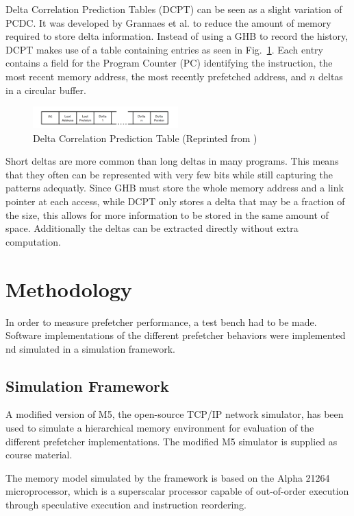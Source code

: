 \documentclass[a4paper]{IEEEtran}
\begin{document}
Delta Correlation Prediction Tables (DCPT) can be seen as a slight variation of PCDC.
It was developed by Grannaes et al. \cite{dcpt} to reduce the amount of memory required to store delta information.
Instead of using a GHB to record the history, DCPT makes use of a table containing entries as seen in Fig.~\ref{fig:dcpt}.
Each entry contains  a field for the Program Counter (PC) identifying the instruction, the most recent memory address, the most recently prefetched address, and $n$ deltas in a circular buffer.

\begin{figure}[h!]
  \centering
      \includegraphics[width=0.5\textwidth]{Figures/DCTable}
  \caption{Delta Correlation Prediction Table (Reprinted from \protect\cite{dcpt})}
  \label{fig:dcpt}
\end{figure}

Short deltas are more common than long deltas in many programs.
This means that they often can be represented with very few bits while still capturing the patterns adequatly.
Since GHB must store the whole memory address and a link pointer at each access, while DCPT only stores a delta that may be a fraction of the size, this allows for more information to be stored in the same amount of space.
Additionally the deltas can be extracted directly without extra computation.

\section{Methodology}

In order to measure prefetcher performance, a test bench had to be made.
Software implementations of the different prefetcher behaviors were implemented nd simulated in a simulation framework.

\subsection{Simulation Framework}

A modified version of M5, the open-source TCP/IP network simulator\cite{M5paper}, has been used to simulate a hierarchical memory environment for evaluation of the different prefetcher implementations.
The modified M5 simulator is supplied as course material.

The memory model simulated by the framework is based on the Alpha 21264 microprocessor, which is a superscalar processor capable of out-of-order execution through speculative execution and instruction reordering.
\end{document}
